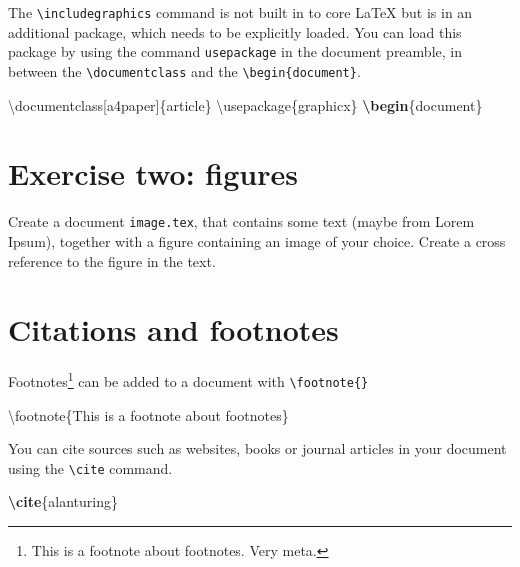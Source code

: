 \documentclass[
]{book}
\newenvironment{Shaded}{\begin{snugshade}}{\end{snugshade}}
\newcommand{\BuiltInTok}[1]{#1}
\newcommand{\ExtensionTok}[1]{#1}
\newcommand{\FunctionTok}[1]{\textcolor[rgb]{0.00,0.00,0.00}{#1}}
\newcommand{\KeywordTok}[1]{\textcolor[rgb]{0.13,0.29,0.53}{\textbf{#1}}}
\newcommand{\NormalTok}[1]{#1}
\begin{document}
The \texttt{\textbackslash{}includegraphics} command is not built in to core LaTeX but is in an additional package, which needs to be explicitly loaded. You can load this package by using the command \texttt{usepackage} in the document preamble, in between the \texttt{\textbackslash{}documentclass} and the \texttt{\textbackslash{}begin\{document\}}.

\begin{Shaded}
\begin{Highlighting}[]
\BuiltInTok{\textbackslash{}documentclass}\NormalTok{[a4paper]\{}\ExtensionTok{article}\NormalTok{\}}
\BuiltInTok{\textbackslash{}usepackage}\NormalTok{\{}\ExtensionTok{graphicx}\NormalTok{\}}
\KeywordTok{\textbackslash{}begin}\NormalTok{\{}\ExtensionTok{document}\NormalTok{\}}
\end{Highlighting}
\end{Shaded}

\hypertarget{ex2}{%
\section{Exercise two: figures}\label{ex2}}

Create a document \texttt{image.tex}, that contains some text (maybe from Lorem Ipsum), together with a figure containing an image of your choice. Create a cross reference to the figure in the text.

\hypertarget{citations-and-footnotes}{%
\section{Citations and footnotes}\label{citations-and-footnotes}}

Footnotes\footnote{This is a footnote about footnotes. Very meta.} can be added to a document with \texttt{\textbackslash{}footnote\{\}}

\begin{Shaded}
\begin{Highlighting}[]
\FunctionTok{\textbackslash{}footnote}\NormalTok{\{This is a footnote about footnotes\}}
\end{Highlighting}
\end{Shaded}

You can cite sources such as websites, books or journal articles in your document using the \texttt{\textbackslash{}cite} command.

\begin{Shaded}
\begin{Highlighting}[]
\KeywordTok{\textbackslash{}cite}\NormalTok{\{}\ExtensionTok{alanturing}\NormalTok{\}}
\end{Highlighting}
\end{Shaded}
\end{document}
